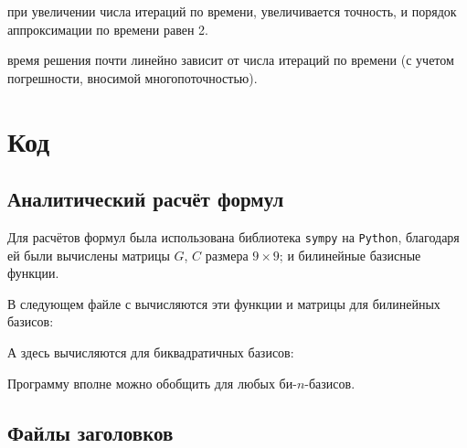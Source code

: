 \noindent{}

\conclusion при увеличении числа итераций по времени, увеличивается точность, и порядок аппроксимации по времени равен 2.

\noindent{}

\conclusion время решения почти линейно зависит от числа итераций по времени (с учетом погрешности, вносимой многопоточностью).

\section{Код}

\subsection{Аналитический расчёт формул}

Для расчётов формул была использована библиотека \texttt{sympy} на \texttt{Python}, благодаря ей были вычислены матрицы $G$, $C$ размера $9\times 9$; и билинейные базисные функции. 

В следующем файле с вычисляются эти функции и матрицы для билинейных базисов:


А здесь вычисляются для биквадратичных базисов:


Программу вполне можно обобщить для любых би-$n$-базисов.

\subsection{Файлы заголовков}

